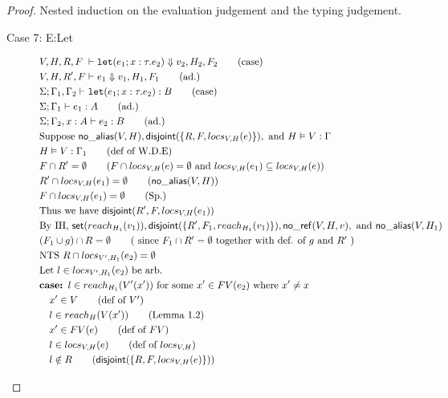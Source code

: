 \documentclass[11pt]{article}
\newcommand{\ms}[1]{\ensuremath{\mathsf{#1}}}
\newcommand{\irl}[1]{\mathtt{#1}}
\newcommand{\na}[1]{\mathsf{no\_alias}(#1)}
\newcommand{\nr}[1]{\mathsf{no\_ref}(#1)}
\newcommand{\dist}[1]{\mathsf{disjoint}(#1)}
\begin{document}
\begin{proof}
Nested induction on the evaluation judgement and the typing judgement.\\
\begin{description}
  \item [Case 7: E:Let]
  \begin{align*}
  &V,H,R,F \; \vdash \irl{let}(e_1; x : \tau.e_2) \Downarrow v_2,H_2,F_2 \tag{case}\\
  &V,H,R',F \vdash e_1 \Downarrow v_1,H_1,F_1 \tag{ad.}\\
  &\Sigma; \Gamma_1,\Gamma_2 \vdash \irl{let}(e_1; x : \tau.e_2) : B \tag{case}\\
  &\Sigma; \Gamma_1 \vdash e_1 : A \tag{ad.}\\
  &\Sigma; \Gamma_2, x : A \vdash e_2 : B \tag{ad.}\\
  &\text{Suppose } \na{V,H}, \dist{\{R,F,locs_{V,H}(e)\}}, \text{ and } H \vDash V : \Gamma\\
  &H \vDash V : \Gamma_1 \tag{def of W.D.E}\\
  &F \cap R' = \emptyset \tag{$F \cap locs_{V,H}(e) = \emptyset$ and $locs_{V,H}(e_1) \subseteq locs_{V,H}(e)$}\\
  &R' \cap locs_{V,H}(e_1) = \emptyset \tag{$\na{V,H}$}\\
  &F \cap locs_{V,H}(e_1) = \emptyset \tag{Sp.}\\
  &\text{Thus we have } \dist{R',F,locs_{V,H}(e_1)}\\
  &\text{By IH, } \ms{set}(reach_{H_1}(v_1)), \dist{\{R',F_1,reach_{H_1}(v_1)\}}, \nr{V,H,v},\text{ and } \na{V,H_1}\\
  &(F_1 \cup g) \cap R = \emptyset \tag{ since  $F_1 \cap R' = \emptyset$ together with def. of $g$ and $R'$ }\\
  &\text{NTS } R \cap locs_{V',H_1}(e_2) = \emptyset\\
  &\text{Let } l \in locs_{V',H_1}(e_2) \text{ be arb.}\\
  &\textbf{case: } l \in reach_{H_1}(V'(x')) \text{ for some $x' \in FV(e_2)$ where } x' \ne x\\
  &\quad x' \in V \tag{def of $V'$}\\
  &\quad l \in reach_{H}(V(x')) \tag{Lemma 1.2}\\
  &\quad x' \in FV(e) \tag{def of $FV$}\\
  &\quad l \in locs_{V,H}(e) \tag{def of $locs_{V,H}$}\\
  &\quad l \notin R \tag{$\dist{\{R,F,locs_{V,H}(e)\}}$}\\

\end{align*}
\end{description}
\end{proof}
\end{document}
